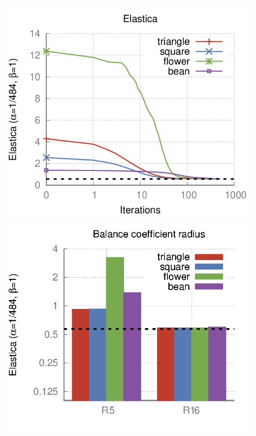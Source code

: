 \begin{frame}
\begin{minipage}{0.74\textwidth}
\includegraphics[scale=0.18]{figures/elastica-minimization/with-neighborhood-flow/plots/elastica.png}\\
\includegraphics[scale=0.18]{figures/elastica-minimization/with-neighborhood-flow/plots/bars.png}
\end{minipage}
\end{frame}
